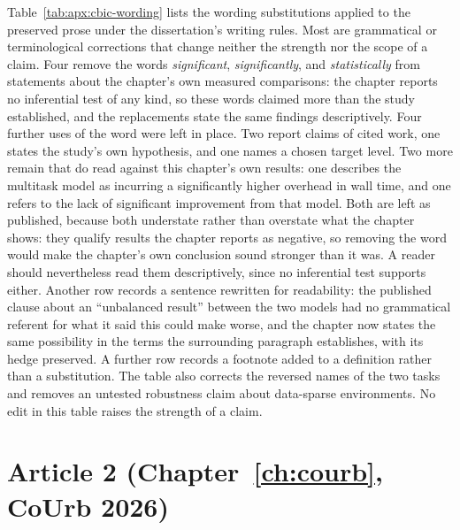 Table~\ref{tab:apx:cbic-wording} lists the wording substitutions applied to the
preserved prose under the dissertation's writing rules. Most are grammatical or
terminological corrections that change neither the strength nor the scope of a claim.
Four remove the words
\emph{significant}, \emph{significantly}, and \emph{statistically} from statements
about the chapter's own measured comparisons: the chapter reports no inferential test of
any kind, so these words claimed more than the study established, and the replacements
state the same findings descriptively. Four further uses of the word were left in place.
Two report claims of cited work, one states the study's own hypothesis, and one names a
chosen target level. Two more remain that do read against this chapter's own results:
one describes the multitask model as incurring a significantly higher overhead in wall
time, and one refers to the lack of significant improvement from that model. Both are
left as published, because both understate rather than overstate what the chapter shows:
they qualify results the chapter reports as negative, so removing the word would make the
chapter's own conclusion sound stronger than it was. A reader should nevertheless read
them descriptively, since no inferential test supports either. Another row records a
sentence rewritten for readability: the published clause about an ``unbalanced result'' between
the two models had no grammatical referent for what it said this could make worse, and the
chapter now states the same possibility in the terms the surrounding paragraph establishes,
with its hedge preserved. A further row records a footnote added to a definition rather than
a substitution. The table also corrects the reversed names of the two tasks and removes an
untested robustness claim about data-sparse environments. No edit in this table raises the
strength of a claim.



\section{Article 2 (Chapter~\ref{ch:courb}, CoUrb 2026)}
\label{apx:errata:courb}

